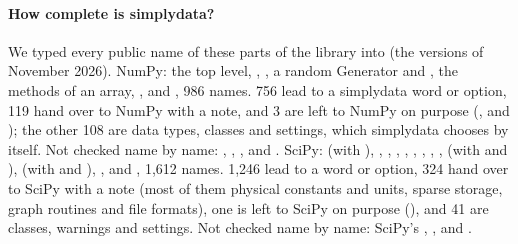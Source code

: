 \paragraph{How complete is simplydata?}
We typed every public name of these parts of the library into  (the versions of November 2026).
NumPy: the top level, , , a random Generator and , the methods of an
array, ,  and , 986 names. 756 lead to a simplydata word or
option, 119 hand over to NumPy with a note, and 3 are left to NumPy on purpose (, 
and ); the other 108 are data types, classes and settings, which simplydata chooses by itself.
Not checked name by name: , , ,  and .
SciPy:  (with ), , , ,
, , , , ,  (with
 and ),  (with  and ),
,  and , 1,612 names. 1,246 lead to a word or option, 324 hand over to
SciPy with a note (most of them physical constants and units, sparse storage, graph routines and file formats),
one is left to SciPy on purpose (), and 41 are classes, warnings and settings. Not
checked name by name: SciPy's , ,  and .
